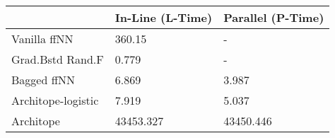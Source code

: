 \begin{tabular}{lll}
\toprule
{} & In-Line (L-Time) & Parallel (P-Time) \\
\midrule
Vanilla ffNN       &           360.15 &                 - \\
Grad.Bstd Rand.F   &            0.779 &                 - \\
Bagged ffNN        &            6.869 &             3.987 \\
Architope-logistic &            7.919 &             5.037 \\
Architope          &        43453.327 &         43450.446 \\
\bottomrule
\end{tabular}
